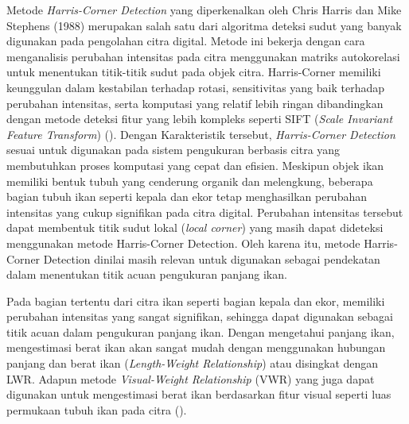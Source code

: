 Metode \emph{Harris-Corner Detection} yang diperkenalkan oleh Chris Harris dan Mike Stephens (1988) merupakan salah satu dari algoritma deteksi sudut yang banyak digunakan pada pengolahan citra digital.
Metode ini bekerja dengan cara menganalisis perubahan intensitas pada citra menggunakan matriks autokorelasi untuk menentukan titik-titik sudut pada objek citra.
Harris-Corner memiliki keunggulan dalam kestabilan terhadap rotasi, sensitivitas yang baik terhadap perubahan intensitas, serta komputasi yang relatif lebih ringan dibandingkan dengan metode deteksi fitur yang lebih kompleks seperti SIFT (\emph{Scale Invariant Feature Transform}) (\cite{Lowe2004}). Dengan Karakteristik tersebut, \emph{Harris-Corner Detection} sesuai untuk digunakan pada sistem pengukuran berbasis citra yang membutuhkan proses komputasi yang cepat dan efisien.
Meskipun objek ikan memiliki bentuk tubuh yang cenderung organik dan melengkung, beberapa bagian tubuh ikan seperti kepala dan ekor tetap menghasilkan perubahan intensitas yang cukup signifikan pada citra digital. 
Perubahan intensitas tersebut dapat membentuk titik sudut lokal (\emph{local corner}) yang masih dapat dideteksi menggunakan metode Harris-Corner Detection. Oleh karena itu, metode Harris-Corner Detection dinilai masih relevan untuk digunakan sebagai pendekatan dalam menentukan titik acuan pengukuran panjang ikan.

Pada bagian tertentu dari citra ikan seperti bagian kepala dan ekor, memiliki perubahan intensitas yang sangat signifikan,
sehingga dapat digunakan sebagai titik acuan dalam pengukuran panjang ikan. Dengan mengetahui panjang ikan, mengestimasi berat ikan akan sangat mudah dengan menggunakan hubungan panjang dan berat ikan (\emph{Length-Weight Relationship}) atau disingkat dengan LWR\@.
Adapun metode \emph{Visual-Weight Relationship} (VWR) yang juga dapat digunakan untuk mengestimasi berat ikan berdasarkan fitur visual seperti luas permukaan tubuh ikan pada citra (\cite{Gm2023}). 

